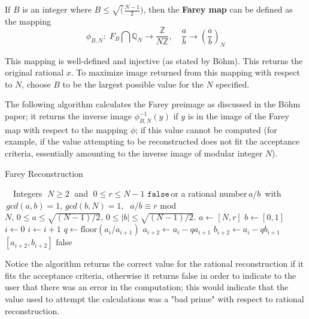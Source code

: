 \documentclass[letterpaper,12pt,titlepage,oneside,final]{book}
\newcommand\abs[1]{\left|#1\right|}
\begin{document}
If ${B}$ is an integer where ${B \leq \sqrt(\frac{N - 1}{2})}$, then the \textbf{Farey map} can be defined as the mapping
\begin{equation*}
  \phi_{B, N}:\; F_B \bigcap \mathbb{Q}_N \rightarrow \frac{\mathbb{Z}}{N\mathbb{Z}},\quad \frac{a}{b} \rightarrow \left(\frac{a}{b}\right)_N
\end{equation*}

This mapping is well-defined and injective (as stated by B\"ohm).  This returns the original rational ${x}$.  To maximize image returned from this mapping with respect to ${N}$, choose ${B}$ to be the largest possible value for the ${N}$ specified.

The following algorithm calculates the Farey preimage as discussed in the B\"ohm paper; it returns the inverse image ${\phi_{B, N}^{-1}(y)}$ if ${y}$ is in the image of the Farey map with respect to the mapping ${\phi}$; if this value cannot be computed (for example, if the value attempting to be reconstructed does not fit the acceptance criteria, essentially amounting to the inverse image of modular integer ${N}$).

\begin{algorithm}[H]
\caption{Farey Reconstruction}\label{farey}
\begin{algorithmic}[1]
\Input $\quad$Integers $\; N \geq 2 \;$ and $\; 0 \leq r \leq N - 1$
\Output $\texttt{false} \,$or a rational number$\, a/b \,$ with$\, gcd(a, b) = 1,\, gcd(b, N) = 1,$ $\; a/b \equiv r $ mod $ N, \, 0 \leq a \leq \sqrt{(N-1)/2}, \, 0 \leq \abs{b} \leq \sqrt{(N-1)/2}.$ 
\State $a \gets [ N, r]$
\State $b \gets [ 0, 1]$
\State $i \gets 0$
  \State $i \gets i + 1$
  \State $q \gets \text{floor}( a_i / a_{i+1})$
  \State $a_{i+2} \gets a_i - qa_{i+1}$
  \State $b_{i+2} \gets a_i - qb_{i+1}$
\EndWhile\\  
  \State \quad \Return $[ a_{i+2}, b_{i+2}]$
\Else 
  \State \quad \Return false
\EndIf
\EndProcedure
\end{algorithmic}
\end{algorithm}

Notice the algorithm returns the correct value for the rational reconstruction if it fits the acceptance criteria, otherwise it returns false in order to indicate to the user that there was an error in the computation; this would indicate that the value used to attempt the calculations was a "bad prime" with respect to rational reconstruction.
\end{document}
